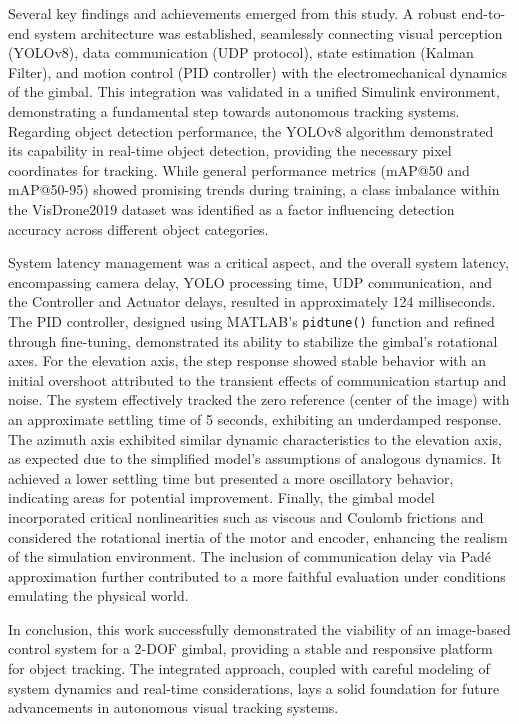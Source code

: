 Several key findings and achievements emerged from this study. A robust end-to-end system architecture was established, seamlessly connecting visual perception (YOLOv8), data communication (UDP protocol), state estimation (Kalman Filter), and motion control (PID controller) with the electromechanical dynamics of the gimbal. This integration was validated in a unified Simulink environment, demonstrating a fundamental step towards autonomous tracking systems. Regarding object detection performance, the YOLOv8 algorithm demonstrated its capability in real-time object detection, providing the necessary pixel coordinates for tracking. While general performance metrics (mAP@50 and mAP@50-95) showed promising trends during training, a class imbalance within the VisDrone2019 dataset was identified as a factor influencing detection accuracy across different object categories.

System latency management was a critical aspect, and the overall system latency, encompassing camera delay, YOLO processing time, UDP communication, and the Controller and Actuator delays, resulted in approximately 124 milliseconds. The PID controller, designed using MATLAB's \texttt{pidtune()} function and refined through fine-tuning, demonstrated its ability to stabilize the gimbal's rotational axes. For the elevation axis, the step response showed stable behavior with an initial overshoot attributed to the transient effects of communication startup and noise. The system effectively tracked the zero reference (center of the image) with an approximate settling time of 5 seconds, exhibiting an underdamped response. The azimuth axis exhibited similar dynamic characteristics to the elevation axis, as expected due to the simplified model's assumptions of analogous dynamics. It achieved a lower settling time but presented a more oscillatory behavior, indicating areas for potential improvement. Finally, the gimbal model incorporated critical nonlinearities such as viscous and Coulomb frictions and considered the rotational inertia of the motor and encoder, enhancing the realism of the simulation environment. The inclusion of communication delay via Padé approximation further contributed to a more faithful evaluation under conditions emulating the physical world.

In conclusion, this work successfully demonstrated the viability of an image-based control system for a 2-DOF gimbal, providing a stable and responsive platform for object tracking. The integrated approach, coupled with careful modeling of system dynamics and real-time considerations, lays a solid foundation for future advancements in autonomous visual tracking systems.

